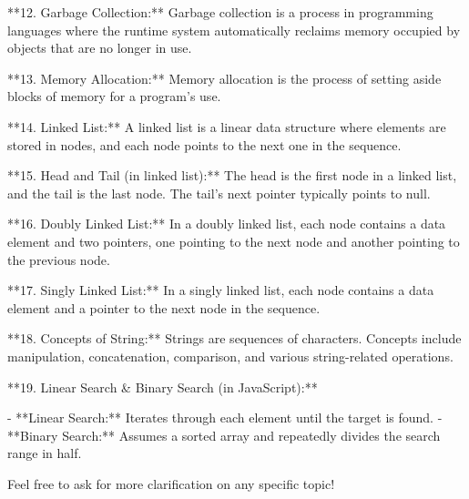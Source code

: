**12. Garbage Collection:** Garbage collection is a process in programming languages where the runtime system automatically reclaims memory occupied by objects that are no longer in use.

**13. Memory Allocation:** Memory allocation is the process of setting aside blocks of memory for a program's use.

**14. Linked List:** A linked list is a linear data structure where elements are stored in nodes, and each node points to the next one in the sequence.

**15. Head and Tail (in linked list):** The head is the first node in a linked list, and the tail is the last node. The tail's next pointer typically points to null.

**16. Doubly Linked List:** In a doubly linked list, each node contains a data element and two pointers, one pointing to the next node and another pointing to the previous node. 

**17. Singly Linked List:** In a singly linked list, each node contains a data element and a pointer to the next node in the sequence.

**18. Concepts of String:** Strings are sequences of characters. Concepts include manipulation, concatenation, comparison, and various string-related operations.

**19. Linear Search & Binary Search (in JavaScript):**

- **Linear Search:** Iterates through each element until the target is found.
- **Binary Search:** Assumes a sorted array and repeatedly divides the search range in half.

Feel free to ask for more clarification on any specific topic!